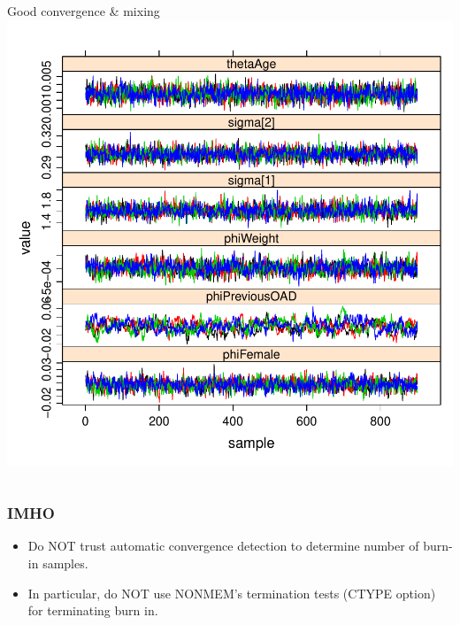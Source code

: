 \documentclass[handout]{beamer}
\begin{document}
\begin{frame}
\begin{columns}
\vspace{-8pt}
Good convergence \& mixing\\
\includegraphics[width=\textwidth,height=0.4\textheight]{graphics/goodConvergence.pdf}
\end{columns}

\end{frame}

\begin{frame}
\frametitle{IMHO}  

  \begin{itemize}
\item Do NOT trust automatic convergence detection to determine number
of burn-in samples. 
\item In particular, do NOT use NONMEM's termination tests (CTYPE
  option) for terminating burn in.
  \end{itemize}


\end{frame}
\end{document}
